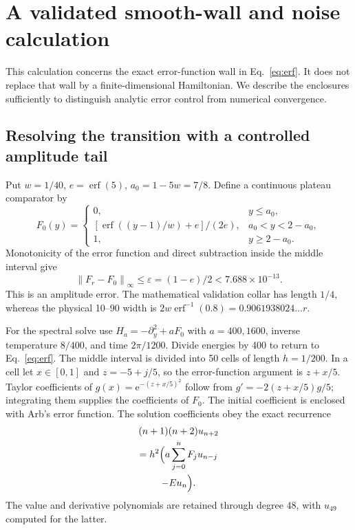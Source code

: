 \documentclass[aps,pra,reprint,superscriptaddress,longbibliography]{revtex4-2}
\newcommand{\ee}{\mathrm e}
\newcommand{\norm}[1]{\left\lVert#1\right\rVert}
\begin{document}
\section{A validated smooth-wall and noise calculation}
\label{app:certificate}

This calculation concerns the exact error-function wall in
Eq.~\eqref{eq:erf}. It does not replace that wall by a finite-dimensional
Hamiltonian. We describe the enclosures sufficiently to distinguish
analytic error control from numerical convergence.

\subsection{Resolving the transition with a controlled amplitude tail}

Put $w=1/40$, $e=\operatorname{erf}(5)$, $a_0=1-5w=7/8$. Define
a continuous plateau comparator by
\begin{equation}
 F_0(y)=\begin{cases}
 0,&y\le a_0,\\
 [\operatorname{erf}((y-1)/w)+e]/(2e),&a_0<y<2-a_0,\\
 1,&y\ge2-a_0.
 \end{cases}
\end{equation}
Monotonicity of the error function and direct subtraction inside
the middle interval give
\begin{equation}
 \norm{F_r-F_0}_\infty\le\varepsilon=(1-e)/2
                                      <7.688\times10^{-13}.
                                                               \label{eq:erfamp}
\end{equation}
This is an amplitude error. The mathematical validation collar
has length $1/4$, whereas the physical 10--90 width is
$2w\operatorname{erf}^{-1}(0.8)=0.9061938024\ldots r$.

For the spectral solve use $H_a=-\partial_y^2+aF_0$ with
$a=400,1600$, inverse temperature $8/400$, and time
$2\pi/1200$. Divide energies by 400 to return to
Eq.~\eqref{eq:erf}. The middle interval is divided into 50 cells
of length $h=1/200$. In a cell let $x\in[0,1]$ and
$z=-5+j/5$, so the error-function argument is $z+x/5$.
Taylor coefficients of $g(x)=\ee^{-(z+x/5)^2}$ follow from
$g'=-2(z+x/5)g/5$; integrating them supplies the coefficients
of $F_0$. The initial coefficient is enclosed with Arb's error
function. The solution coefficients obey the exact recurrence
\begin{equation}
 \begin{gathered}
 (n+1)(n+2)u_{n+2}
      \\=h^2\Bigl(a\sum_{j=0}^nF_j u_{n-j}
      \\-E u_n\Bigr).
                                                               \label{eq:erfrecurrence}
 \end{gathered}
\end{equation}
The value and derivative polynomials are retained through degree
48, with $u_{49}$ computed for the latter.
\end{document}
